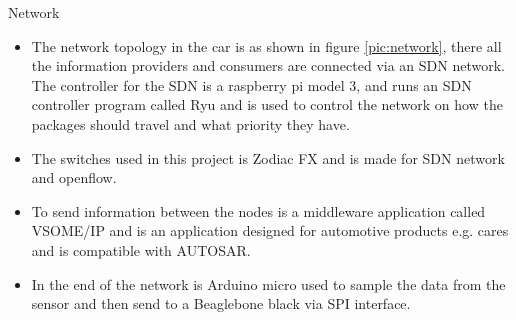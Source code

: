 \documentclass[final,hyperref={pdfpagelabels=false}]{beamer}
\begin{document}
\begin{frame}[t]
\begin{columns}[t]
\begin{column}{.465\textwidth}
%
%
%
%        
%
%
%    
%

\begin{block}{Network}
    \begin{itemize}
        \item The network topology in the car is as shown in figure \ref{pic:network}, there all the information providers and consumers are connected via an SDN network.  The controller for the SDN is a raspberry pi model 3, and runs an SDN controller program called Ryu and is used to control the network on how the packages should travel and what priority they have. 
        \item The switches used in this project is Zodiac FX and is made for SDN network and openflow. 
        \item To send information between the nodes is a middleware application called VSOME/IP and is an application designed for automotive products e.g. cares and is compatible with AUTOSAR. 
        \item In the end of the network is Arduino micro used to sample the data from the sensor and then send to a Beaglebone black via SPI interface. 
    \end{itemize}


\end{block}
\end{column}
\end{columns}
\end{frame}
\end{document}
